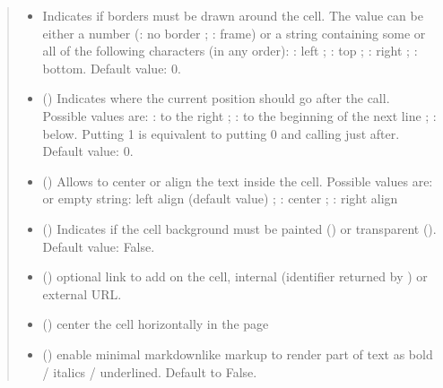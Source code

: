 \documentclass[letterpaper,10pt,english]{sphinxmanual}
\begin{document}
\begin{fulllineitems}
\begin{fulllineitems}
\begin{quote}
\begin{description}
\begin{itemize}
\item {} 
\sphinxAtStartPar
{} \textendash{} Indicates if borders must be drawn around the cell.
The value can be either a number (: no border ; : frame)
or a string containing some or all of the following characters
(in any order):
: left ; : top ; : right ; : bottom. Default value: 0.

\item {} 
\sphinxAtStartPar
{} () \textendash{} Indicates where the current position should go after the call.
Possible values are: : to the right ; : to the beginning of the
next line ; : below. Putting 1 is equivalent to putting 0 and calling
 just after. Default value: 0.

\item {} 
\sphinxAtStartPar
{} () \textendash{} Allows to center or align the text inside the cell.
Possible values are:  or empty string: left align (default value) ;
: center ; : right align

\item {} 
\sphinxAtStartPar
{} () \textendash{} Indicates if the cell background must be painted ()
or transparent (). Default value: False.

\item {} 
\sphinxAtStartPar
{} () \textendash{} optional link to add on the cell, internal
(identifier returned by ) or external URL.

\item {} 
\sphinxAtStartPar
{} () \textendash{} center the cell horizontally in the page

\item {} 
\sphinxAtStartPar
{} () \textendash{} enable minimal markdown\sphinxhyphen{}like markup to render part
of text as bold / italics / underlined. Default to False.


\end{itemize}
\end{description}
\end{quote}
\end{fulllineitems}
\end{fulllineitems}
\end{document}

